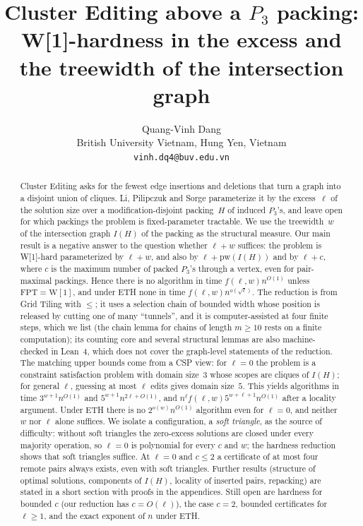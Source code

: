 \documentclass[11pt]{article}
\title{Cluster Editing above a $P_3$ packing:\\ W[1]-hardness in the excess and the treewidth of the intersection graph}
\author{Quang-Vinh Dang\\ British University Vietnam, Hung Yen, Vietnam\\ \texttt{vinh.dq4@buv.edu.vn}}
\date{}
\theoremstyle{definition}
\theoremstyle{remark}
\begin{document}
\maketitle
\begin{abstract}
Cluster Editing asks for the fewest edge insertions and deletions that turn a graph into a disjoint union of cliques.
Li, Pilipczuk and Sorge parameterize it by the excess~$\ell$ of the solution size over a modification-disjoint packing~$H$ of induced $P_3$'s, and leave open for which packings the problem is fixed-parameter tractable.
We use the treewidth~$w$ of the intersection graph $I(H)$ of the packing as the structural measure.
Our main result is a negative answer to the question whether $\ell+w$ suffices: the problem is W[1]-hard parameterized by $\ell+w$, and also by $\ell+\mathrm{pw}(I(H))$ and by $\ell+c$, where $c$ is the maximum number of packed $P_3$'s through a vertex, even for pair-maximal packings. Hence there is no algorithm in time $f(\ell,w)n^{O(1)}$ unless $\mathrm{FPT}=\mathrm{W[1]}$, and under ETH none in time $f(\ell,w)n^{o(\sqrt\ell)}$.
The reduction is from Grid Tiling with $\le$; it uses a selection chain of bounded width whose position is released by cutting one of many ``tunnels'', and it is computer-assisted at four finite steps, which we list (the chain lemma for chains of length $m\ge10$ rests on a finite computation); its counting core and several structural lemmas are also machine-checked in Lean~4, which does not cover the graph-level statements of the reduction.
The matching upper bounds come from a CSP view: for $\ell=0$ the problem is a constraint satisfaction problem with domain size~$3$ whose scopes are cliques of $I(H)$; for general $\ell$, guessing at most $\ell$ edits gives domain size~$5$. This yields algorithms in time $3^{w+1}n^{O(1)}$ and $5^{w+1}n^{2\ell+O(1)}$, and $n^{\ell}f(\ell,w)5^{w+\ell+1}n^{O(1)}$ after a locality argument. Under ETH there is no $2^{o(w)}n^{O(1)}$ algorithm even for $\ell=0$, and neither $w$ nor $\ell$ alone suffices.
We isolate a configuration, a \emph{soft triangle}, as the source of difficulty: without soft triangles the zero-excess solutions are closed under every majority operation, so $\ell=0$ is polynomial for every $c$ and $w$; the hardness reduction shows that soft triangles suffice. At $\ell=0$ and $c\le2$ a certificate of at most four remote pairs always exists, even with soft triangles.
Further results (structure of optimal solutions, components of $I(H)$, locality of inserted pairs, repacking) are stated in a short section with proofs in the appendices.
Still open are hardness for bounded $c$ (our reduction has $c=O(\ell)$), the case $c=2$, bounded certificates for $\ell\ge1$, and the exact exponent of $n$ under ETH.
\end{abstract}











\clearpage
\appendix
\end{document}
